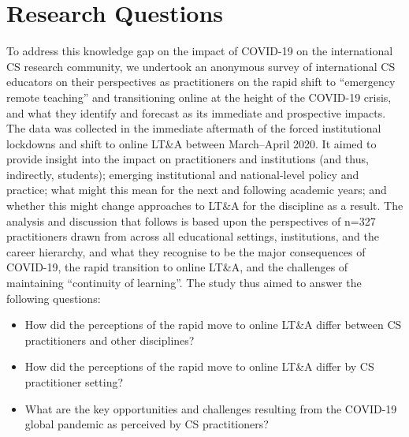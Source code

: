\documentclass[conference]{IEEEtran}
\begin{document}


\section{Research Questions}\label{rqs}

To address this knowledge gap on the impact of COVID-19 on the
international CS research community, we undertook an anonymous survey
of international CS educators on their perspectives as practitioners
on the rapid shift to ``emergency remote teaching'' and transitioning
online at the height of the COVID-19 crisis, and what they identify
and forecast as its immediate and prospective impacts. The data was
collected in the immediate aftermath of the forced institutional
lockdowns and shift to online LT\&A between March--April 2020. It
aimed to provide insight into the impact on practitioners and
institutions (and thus, indirectly, students); emerging institutional
and national-level policy and practice; what might this mean for the
next and following academic years; and whether this might change
approaches to LT\&A for the discipline as a result. The analysis and
discussion that follows is based upon the perspectives of n=327
practitioners drawn from across all educational settings,
institutions, and the career hierarchy, and what they recognise to be
the major consequences of COVID-19, the rapid transition to online
LT\&A, and the challenges of maintaining ``continuity of learning''.
The study thus aimed to answer the following questions:

\begin{itemize}
\item How did the perceptions of the rapid move to online LT\&A differ
between CS practitioners and other disciplines?
\item How did the perceptions of the rapid move to online LT\&A differ
by CS practitioner setting?
\item What are the key opportunities and challenges resulting from the
COVID-19 global pandemic as perceived by CS practitioners?
\end{itemize}
\end{document}

